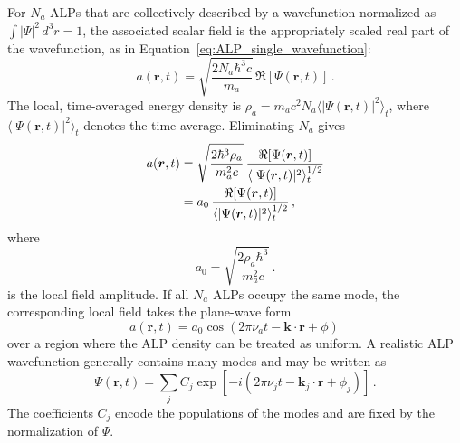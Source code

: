 For $N_a$ ALPs that are collectively described by a wavefunction normalized as $\int|\Psi|^2\,d^3r=1$, the associated scalar field is the appropriately scaled real part of the wavefunction, as in Equation~\eqref{eq:ALP_single_wavefunction}:
\begin{equation}
    a(\boldsymbol{r},t)
    =\sqrt{\frac{2N_a\hbar^3c}{m_a}}\,
      \Re\left[\Psi(\boldsymbol{r},t)\right]
    \,.\label{eq:a0_Psi_real}
\end{equation}
The local, time-averaged energy density is $\rho_a=m_a c^2N_a\langle|\Psi(\boldsymbol{r},t)|^2\rangle_t$, where $\langle|\Psi(\boldsymbol{r},t)|^2\rangle_t$ denotes the time average.
Eliminating $N_a$ gives
\begin{align}
    a(\boldsymbol{r},t)
    &=\sqrt{\frac{2\hbar^3\rho_a}{m_a^2c}}\,
      \frac{\Re\left[\Psi(\boldsymbol{r},t)\right]}
      {\langle|\Psi(\boldsymbol{r},t)|^2\rangle_t^{1/2}}
      \notag\\
    &=a_0\,
      \frac{\Re\left[\Psi(\boldsymbol{r},t)\right]}
      {\langle|\Psi(\boldsymbol{r},t)|^2\rangle_t^{1/2}}
    \,,\label{eq:a0_rhoDM_Psi_real}
\end{align}
where
\begin{equation}
    a_0
    =\sqrt{\frac{2\rho_a\hbar^3}{m_a^2c}}
    \,.\label{eq:a0_rhoDM}
\end{equation}
is the local field amplitude.
If all $N_a$ ALPs occupy the same mode, the corresponding local field takes the plane-wave form
\begin{equation}
    a(\boldsymbol{r},t)
    =a_0\cos\left(2\pi\nu_a t-\boldsymbol{k}\cdot\boldsymbol{r}+\phi\right)
    \,\label{eq:ALP_field}
\end{equation}
over a region where the ALP density can be treated as uniform.
A realistic ALP wavefunction generally contains many modes and may be written as
\begin{equation}
    \Psi(\boldsymbol{r},t)
    =\sum_j C_j
    \exp\left[-i\left(2\pi\nu_jt-\boldsymbol{k}_j\cdot\boldsymbol{r}+\phi_j\right)\right]
    \,.\label{eq:ALP_sum}
\end{equation}
The coefficients $C_j$ encode the populations of the modes and are fixed by the normalization of $\Psi$.
